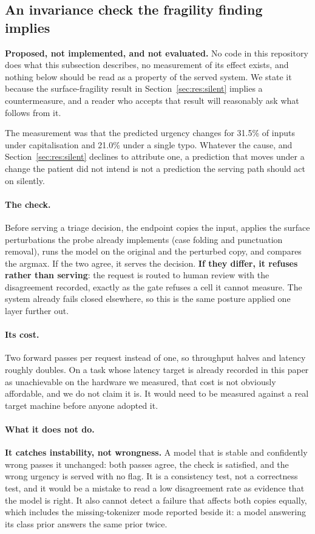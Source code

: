 \subsection{An invariance check the fragility finding implies}
\label{sec:system:invariance}

\textbf{Proposed, not implemented, and not evaluated.} No code in this
repository does what this subsection describes, no measurement of its effect
exists, and nothing below should be read as a property of the served system. We
state it because the surface-fragility result in
Section~\ref{sec:res:silent} implies a countermeasure, and a reader who accepts
that result will reasonably ask what follows from it.

The measurement was that the predicted urgency changes for 31.5\% of inputs
under capitalisation and 21.0\% under a single typo. Whatever the cause, and
Section~\ref{sec:res:silent} declines to attribute one, a prediction that moves
under a change the patient did not intend is not a prediction the serving path
should act on silently.

\paragraph{The check.} Before serving a triage decision, the endpoint copies the
input, applies the surface perturbations the probe already implements (case
folding and punctuation removal), runs the model on the original and the
perturbed copy, and compares the argmax. If the two agree, it serves the
decision. \textbf{If they differ, it refuses rather than serving}: the request
is routed to human review with the disagreement recorded, exactly as the gate
refuses a cell it cannot measure. The system already fails closed elsewhere, so
this is the same posture applied one layer further out.

\paragraph{Its cost.} Two forward passes per request instead of one, so
throughput halves and latency roughly doubles. On a task whose latency target is
already recorded in this paper as unachievable on the hardware we measured, that
cost is not obviously affordable, and we do not claim it is. It would need to be
measured against a real target machine before anyone adopted it.

\paragraph{What it does not do.} \textbf{It catches instability, not
wrongness.} A model that is stable and confidently wrong passes it unchanged:
both passes agree, the check is satisfied, and the wrong urgency is served with
no flag. It is a consistency test, not a correctness test, and it would be a
mistake to read a low disagreement rate as evidence that the model is right. It
also cannot detect a failure that affects both copies equally, which includes the
missing-tokenizer mode reported beside it: a model answering its class prior
answers the same prior twice.

